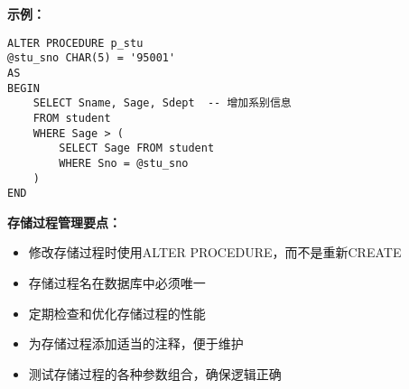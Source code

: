 \textbf{示例：}
\begin{lstlisting}[backgroundcolor=\color{Gray!10}]
ALTER PROCEDURE p_stu
@stu_sno CHAR(5) = '95001'
AS
BEGIN
    SELECT Sname, Sage, Sdept  -- 增加系别信息
    FROM student
    WHERE Sage > (
        SELECT Sage FROM student
        WHERE Sno = @stu_sno
    )
END
\end{lstlisting}

\begin{mdframed}[backgroundcolor=yellow!10]
\textbf{存储过程管理要点：}
\begin{itemize}
\item 修改存储过程时使用ALTER PROCEDURE，而不是重新CREATE
\item 存储过程名在数据库中必须唯一
\item 定期检查和优化存储过程的性能
\item 为存储过程添加适当的注释，便于维护
\item 测试存储过程的各种参数组合，确保逻辑正确
\end{itemize}
\end{mdframed}